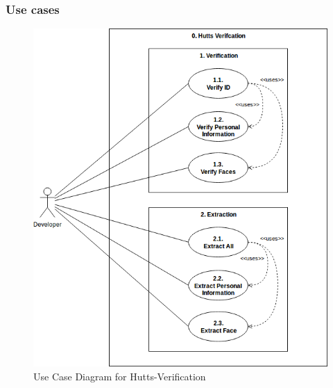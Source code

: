 \documentclass{article}
\begin{document}
		\subsubsection{Use cases}
		\begin{figure}[h]
			\includegraphics[scale=0.6]{img/use_case.png}
			\caption{Use Case Diagram for Hutts-Verification}
		\end{figure}
\end{document}
